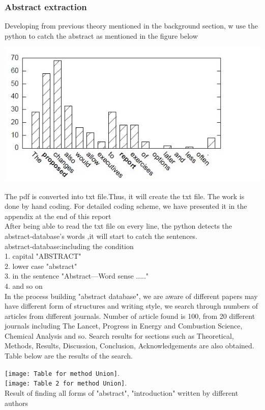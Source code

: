 \subsubsection*{Abstract extraction}
	Developing from previous theory mentioned in the background section, w use the python to catch the abstract as mentioned in the figure below
	\begin{center}
		\includegraphics[width=0.8\columnwidth]{Union_Background_Chart_2}
	\end{center}
	The pdf is converted into txt file.Thus, it will create the txt file. The work is done by hand coding. For detailed coding scheme, we have presented it in the appendix at the end of this report\\ 
	After being able to read the txt file on every line, the python detects the abstract-database's words ,it will start to catch the sentences.\\ 	
	abstract-database:including the condition\\
	1. capital         "ABSTRACT"\\
	2. lower case      "abstract"\\
	3. in the sentence "Abstract—Word sense ....."\\
	4. and so on \\
	In the process building "abstract database", we are aware of different papers may have different form of structures and writing style, we search through numbers of articles from different journals. Number of article found is 100, from 20 different journals including The Lancet, Progress in Energy and Combustion Science, Chemical Analysis and so. Search results for sections such as Theoretical, Methods, Results, Discussion, Conclusion, Acknowledgements are also obtained.  Table below are the results of the search.\\
	\begin{table}
		\texttt{[image: Table for method Union]}.\\
		\texttt{[image: Table 2 for method Union]}.\\
		\caption{Result of finding all forms of "abstract", "introduction" written by different authors}
	\end{table}
